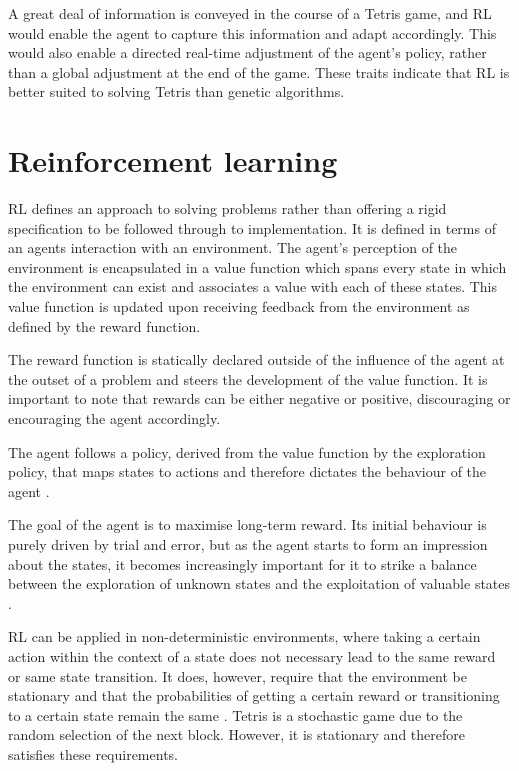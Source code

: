 \documentclass{rucsthesis}
\begin{document}
A great deal of information is conveyed in the course of a Tetris game, and RL would enable the agent to capture this information and adapt accordingly. This would also enable a directed real-time adjustment of the agent's policy, rather than a global adjustment at the end of the game. These traits indicate that RL is better suited to solving Tetris than genetic algorithms. 

\section{Reinforcement learning}

RL defines an approach to solving problems rather than offering a rigid specification to be followed through to implementation. It is defined in terms of an agents interaction with an environment. The agent's perception of the environment is encapsulated in a value function which spans every state in which the environment can exist and associates a value with each of these states. This value function is updated upon receiving feedback from the environment as defined by the reward function.

The reward function is statically declared outside of the influence of the agent at the outset of a problem and steers the development of the value function. It is important to note that rewards can be either negative or positive, discouraging or encouraging the agent accordingly. 

The agent follows a policy, derived from the value function by the exploration policy, that maps states to actions and therefore dictates the behaviour of the agent \citep{suttonbarto}.

The goal of the agent is to maximise long-term reward. Its initial behaviour is purely driven by trial and error, but as the agent starts to form an impression about the states, it becomes increasingly important for it to strike a balance between the exploration of unknown states and the exploitation of valuable states \citep{suttonbarto}.

RL can be applied in non-deterministic environments, where taking a certain action within the context of a state does not necessary lead to the same reward or same state transition. It does, however, require that the environment be stationary and that the probabilities of getting a certain reward or transitioning to a certain state remain the same \citep{kaelbling96reinforcement}. Tetris is a stochastic game due to the random selection of the next block. However, it is stationary and therefore satisfies these requirements.
\end{document}
